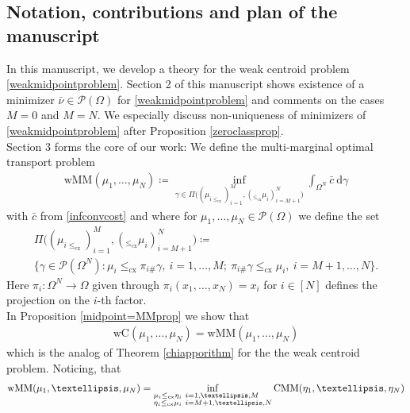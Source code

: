 \documentclass[10pt,a4paper]{amsart}
\newcommand{\dd}{\mathrm{d}}
\begin{document}
\subsection{Notation, contributions and plan of the manuscript}
In this manuscript, we develop a theory for the weak centroid problem \eqref{weakmidpointproblem}. Section 2 of this manuscript shows existence of a minimizer $\bar\nu\in\mathcal P(\Omega)$ for \eqref{weakmidpointproblem} and comments on the cases $M=0$ and $M=N$. We especially discuss non-uniqueness of minimizers of \eqref{weakmidpointproblem} after Proposition \ref{zeroclassprop}.\\
Section 3 forms the core of our work: We define the multi-marginal optimal transport problem 
\begin{gather}\label{weakMM}
	\text{wMM}(\mu_1,\dots,\mu_N)\coloneqq\inf_{\gamma\in\Pi\big((\mu_{i\leq_{\text{cx}}})_{i=1}^M,(_{\leq_{\text{cx}}}\mu_i)_{i=M+1}^N\big)}\int_{\Omega^N}\bar c\ \dd\gamma
\end{gather}
with $\bar c$ from \eqref{infconvcost} and where for $\mu_1,\dots,\mu_N\in\mathcal P(\Omega)$ we define the set
\begin{equation}\label{Pmargset}
	\begin{gathered}
		\Pi\big((\mu_{i\leq_{\text{cx}}})_{i=1}^M,(_{\leq_{\text{cx}}}\mu_i)_{i=M+1}^N\big)\coloneqq\\
		\Big\{\gamma\in\mathcal P(\Omega^N):\mu_i\leq_{\text{cx}}\pi_{i\#}\gamma,\ i=1,\dots,M;\ \pi_{i\#}\gamma\leq_{\text{cx}}\mu_i,\ i=M+1,\dots,N\Big\}.
	\end{gathered}
\end{equation}
Here $\pi_i:\Omega^N\rightarrow\Omega$ given through $\pi_i(x_1,\dots,x_N)=x_i$ for $i\in[N]$ defines the projection on the $i$-th factor.\\
In Proposition \ref{midpoint=MMprop} we show that
\begin{gather*}
	\text{wC}(\mu_1,\dots,\mu_N)=\text{wMM}(\mu_1,\dots,\mu_N)
\end{gather*}
which is the analog of Theorem \ref{chiapporithm} for the the weak centroid problem.
Noticing, that 
\begin{gather*}
	\text{wMM}(\mu_1,\dots,\mu_N)=\inf_{\begin{subarray}{l}\mu_i\leq_{\text{cx}}\eta_i\ i=1,\dots,M\\
			\eta_i\leq_{\text{cx}}\mu_i\ i=M+1,\dots,N	\end{subarray}}\text{CMM}(\eta_1,\dots,\eta_N)
\end{gather*}
\end{document}
